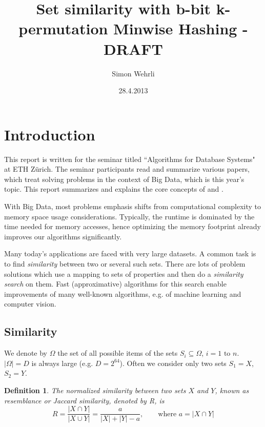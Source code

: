 \documentclass[a4paper]{article}
\author{Simon Wehrli}
\date{28.4.2013}
\title{Set similarity with b-bit k-permutation Minwise Hashing - DRAFT}
\newtheorem{mydef}{Definition}
\begin{document}
 
\maketitle

\section{Introduction}
This report is written for the seminar titled ``Algorithms for Database Systems" at ETH Z\"{u}rich. The seminar participants read and summarize various papers, which treat solving problems in the context of Big Data, which is this year's topic. This report summarizes and explains the core concepts of \citep{LiK11} and \citep{LiOwZhang12}.

With Big Data, most problems emphasis shifts from computational complexity to memory space usage considerations. Typically, the runtime is dominated by the time needed for memory accesses, hence optimizing the memory footprint already improves our algorithms significantly. 

Many today's applications are faced with very large datasets. A common task is to find \emph{similarity} between two or several such sets. There are lots of problem solutions which use a mapping to sets of properties and then do a \emph{similarity search} on them. Fast (approximative) algorithms for this search enable improvements of many well-known algorithms, e.g. of machine learning and computer vision.

\subsection{Similarity}
We denote by $\Omega$ the set of all possible items of the sets $S_i \subseteq \Omega$, $i = 1 \text{ to } n$. $\left| \Omega \right| = D$ is always large (e.g. $D=2^{64}$). Often we consider only two sets $S_1 = X$, $S_2 = Y$.
\begin{framed}
\begin{mydef}\label{def:jaccard}
The normalized similarity between two sets $X$ and $Y$, known as \emph{resemblance} or \emph{Jaccard similarity}, denoted by R, is
\begin{equation}
R=\frac{\left| X \cap Y \right|}{\left| X \cup Y \right|} = \frac{a}{\left| X \right| + \left| Y \right| -a}, \qquad \text{where } a=\left| X \cap Y \right|
\end{equation}
\end{mydef}
\end{framed}
\end{document}
